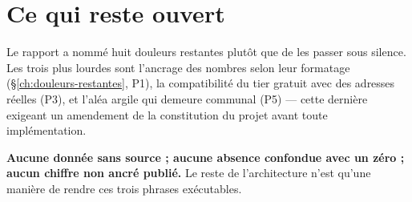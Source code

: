 \section{Ce qui reste ouvert}

Le rapport a nommé huit douleurs restantes plutôt que de les passer sous
silence. Les trois plus lourdes sont l'ancrage des nombres selon leur
formatage (\S\ref{ch:douleurs-restantes}, P1), la compatibilité du tier gratuit
avec des adresses réelles (P3), et l'aléa argile qui demeure communal (P5) —
cette dernière exigeant un amendement de la constitution du projet avant toute
implémentation.

\begin{invariant}[title={La règle qui tient tout le reste}]
\textbf{Aucune donnée sans source ; aucune absence confondue avec un zéro ;
aucun chiffre non ancré publié.} Le reste de l'architecture n'est qu'une
manière de rendre ces trois phrases exécutables.
\end{invariant}
